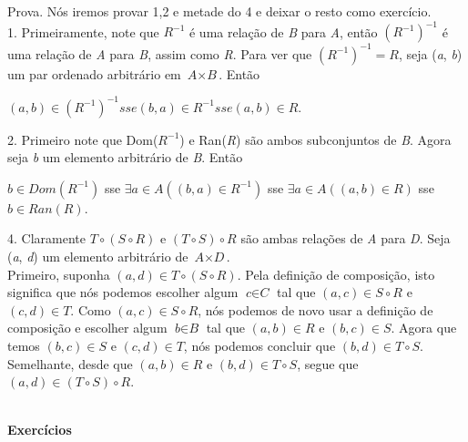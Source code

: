 Prova. Nós iremos provar 1,2 e metade do 4 e deixar o resto como exercício.
\\
1. Primeiramente, note que $\textit{R}^{-1}$ é uma relação de \textit{B} para \textit{A}, então $(\textit{R}^{-1})^{-1}$ é uma relação de \textit{A} para \textit{B}, assim como \textit{R}. Para ver que $(\textit{R}^{-1})^{-1} = \textit{R}$, seja (\textit{a}, \textit{b}) um par ordenado arbitrário em $\textit{A} \times \textit{B}$. Então
\begin{center}
$(\textit{a}, \textit{b}) \in (\textit{R}^{-1})^{-1} sse (\textit{b}, \textit{a}) \in \textit{R}^{-1} sse (\textit{a}, \textit{b}) \in \textit{R}$.
\end{center}
2. Primeiro note que Dom($\textit{R}^{-1}$) e Ran(\textit{R}) são ambos subconjuntos de \textit{B}. Agora seja \textit{b} um elemento arbitrário de \textit{B}. Então
\begin{center}
$\textit{b} \in Dom(\textit{R}^{-1})$ sse $\exists\textit{a} \in \textit{A}((\textit{b}, \textit{a}) \in \textit{R}^{-1})$ sse $\exists\textit{a} \in \textit{A}((\textit{a}, \textit{b}) \in \textit{R})$ sse $\textit{b} \in Ran(\textit{R})$.
\end{center}

4. Claramente $\textit{T} \circ (\textit{S} \circ \textit{R})$  e  $(\textit{T} \circ \textit{S}) \circ \textit{R}$  são ambas relações de \textit{A} para \textit{D}. Seja (\textit{a}, \textit{d}) um elemento arbitrário de $\textit{A} \times \textit{D}$.
\\

Primeiro, suponha $(\textit{a}, \textit{d}) \in \textit{T} \circ (\textit{S} \circ \textit{R})$. Pela definição de composição, isto significa que nós podemos escolher algum $\textit{c} \in \textit{C}$ tal que $(\textit{a}, \textit{c}) \in \textit{S} \circ \textit{R}$ e $(\textit{c}, \textit{d}) \in \textit{T}$. Como $(\textit{a}, \textit{c}) \in \textit{S} \circ \textit{R}$, nós podemos de novo usar a definição de composição e escolher algum $\textit{b} \in \textit{B}$ tal que $(\textit{a}, \textit{b}) \in \textit{R}$ e $(\textit{b}, \textit{c}) \in \textit{S}$. Agora que temos $(\textit{b}, \textit{c}) \in \textit{S}$ e $(\textit{c}, \textit{d}) \in \textit{T}$, nós podemos concluir que $(\textit{b}, \textit{d}) \in \textit{T} \circ \textit{S}$. Semelhante, desde que $(\textit{a}, \textit{b}) \in \textit{R}$ e $(\textit{b}, \textit{d}) \in \textit{T} \circ \textit{S}$,  segue que $(\textit{a}, \textit{d}) \in (\textit{T} \circ \textit{S}) \circ \textit{R}$. 
\\
\\
\begin{center}
\textbf{Exercícios}
\end{center}

